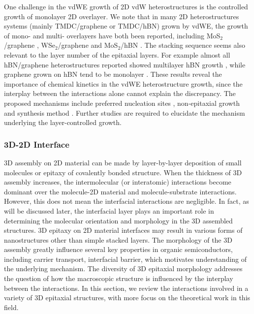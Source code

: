 One challenge in the vdWE growth of 2D vdW heterostructures is the
controlled growth of monolayer 2D overlayer. We note that in many 2D
heterostructures systems (mainly TMDC/graphene or TMDC/hBN) grown by
vdWE, the growth of mono- and multi- overlayers have both been
reported, including MoS\(_{\text{2}}\)/graphene
\cite{Shi_2012_vdw_epi_MoS2_gr,Lin_2014_vdW_solid,Azizi_2015_Freevdw_Gr_TMDCs,Miwa_2015_MoS2_gr,Liu_2016_epi_MoS2_gr_rotation,McCreary_2014_MoS2_gr},
WSe\(_{\text{2}}\)/graphene \cite{Lin_2014_vdW_solid,Azizi_2015_Freevdw_Gr_TMDCs}
and MoS\(_{\text{2}}\)/hBN \cite{Yan_2015_MoS2_on_hBN}. The stacking sequence seems
also relevant to the layer number of the epitaxial layers. For example
almost all hBN/graphene heterostructures reported showed multilayer
hBN growth \cite{Wu_2015_Gr_hBN,Lin_2014_vdW_solid}, while graphene
grown on hBN tend to be monolayer
\cite{Yang_2013_gr_hBN,Wu_2015_Gr_hBN}. These results reveal the
importance of chemical kinetics in the vdWE heterostructure growth, since
the interplay between the interactions alone cannot explain the
discrepancy. The proposed mechanisms include
preferred nucleation sites \cite{Yan_2015_MoS2_on_hBN}, non-epitaxial
growth \cite{Azizi_2015_Freevdw_Gr_TMDCs} and synthesis method
\cite{Azizi_2015_Freevdw_Gr_TMDCs}. Further studies are required to
elucidate the mechanism underlying the layer-controlled growth.



\subsubsection{3D-2D Interface}
\label{sec:org321dcef}

3D assembly on 2D material can be made by layer-by-layer deposition of
small molecules or epitaxy of covalently bonded structure. When the
thickness of 3D assembly increases, the intermolecular (or
interatomic) interactions become dominant over the molecule-2D
material and molecule-substrate interactions. However, this does not
mean the interfacial interactions are negligible. In fact, as will be
discussed later, the interfacial layer plays an important role in
determining the molecular orientation and morphology in the 3D
assembled structures. 3D epitaxy on 2D material interfaces may result
in various forms of nanostructures other than simple stacked
layers. The morphology of the 3D assembly greatly influence several
key properties in organic semiconductors, including carrier transport,
interfacial barrier, which motivates understanding of the underlying
mechanism.  The diversity of 3D epitaxial morphology addresses the
question of how the macroscopic structure is influenced by the
interplay between the interactions. In this section, we review the
interactions involved in a variety of 3D epitaxial structures, with
more focus on the theoretical work in this field.

